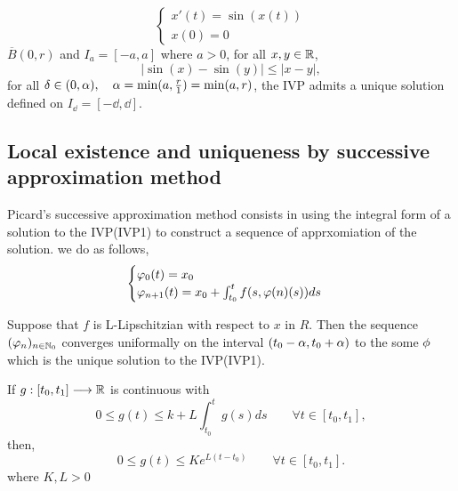 \begin{example}
\[
  \begin{cases}
x'(t)  = \sin (x(t) )    \\
x(0)  = 0
  \end{cases}
\]
$\overline{B}(0, r)$ and $I_{a} = \left[ -a, a \right] $  where $a > 0$, for all $x,y \in   \mathbb{R}  $,
\[
\left| \sin (x) - \sin (y)      \right|   \leq 
\left| x-y \right|,
\]
for all $\delta  \in   (0, \alpha), \quad \alpha = \min (a, \frac{r}{1}) = \min (a, r)  $, the IVP 
admits a unique solution defined on $I_{\dd } = \left[ -\dd , \dd  \right] $.
\end{example}
\subsection{Local existence and uniqueness by successive approximation method}
Picard's successive approximation method consists in using the integral form of a solution to the IVP(IVP1)
to construct a sequence of apprxomiation of the solution. we do as follows,
\[
\begin{cases}
\varphi_{0}(t)  = x_0\\
\varphi _{n+1}(t)  = x_0 + 
\int_{t_0}^{t} f(s, \varphi (n) (s) ) ds
\end{cases}
\]
\begin{theorem}[]
Suppose that $f $ is L-Lipschitzian with respect
to $x $ in 
$R $. Then the sequence $(\varphi _{n}) _{n \in   \mathbb{N}_0} $
converges uniformally on the interval $(t_0 - \alpha, t_0 + \alpha)  $ 
to the some $\phi  $ which is the unique solution to the IVP(IVP1).
\end{theorem}
\begin{corollary}
  If $ g : [t_0, t_1]  \longrightarrow \mathbb{R} $ is continuous with 
  \[
  0 \leq  g(t)  \leq  k + L 
  \int_{t_0}^{t} g(s) ds \quad \quad \forall t \in  [t_0, t_1],
  \]
  then, 
  \[
  0 \leq g(t)  \leq K e^{L(t-t_0) } \quad \quad 
  \forall t \in   \left[ t_0, t_1 \right].
  \]
  where $K, L > 0 $ 
\end{corollary}
